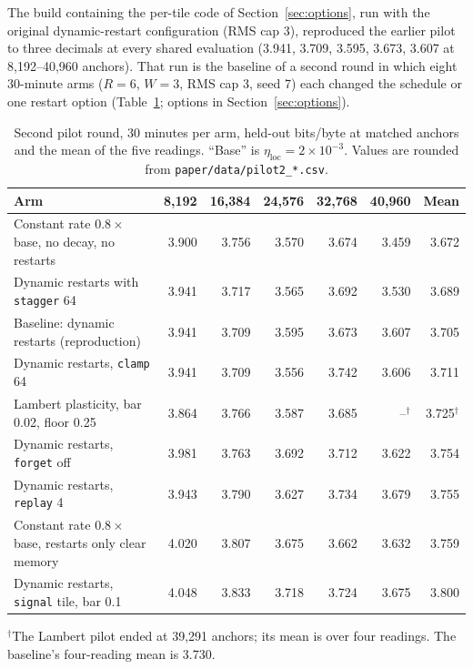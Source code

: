 \documentclass[10pt]{article}
\newcommand{\bpb}{bits/byte}
\newcommand{\code}[1]{\texttt{#1}}
\begin{document}
The build containing the per-tile code of Section~\ref{sec:options}, run with the original
dynamic-restart configuration (RMS cap 3), reproduced the earlier pilot to three decimals at every
shared evaluation (3.941, 3.709, 3.595, 3.673, 3.607 at 8,192--40,960 anchors). That run is the
baseline of a second round in which eight 30-minute arms ($R=6$, $W=3$, RMS cap 3, seed 7) each changed
the schedule or one restart option (Table~\ref{tab:pilot2}; options in Section~\ref{sec:options}).

\begin{table}[t]
\centering
\caption{Second pilot round, 30 minutes per arm, held-out \bpb{} at matched anchors and the mean of
the five readings. ``Base'' is $\eta_{\text{loc}}=2\times10^{-3}$. Values are rounded from
\code{paper/data/pilot2\_*.csv}.}
\label{tab:pilot2}
\small
\begin{tabular}{lrrrrrr}
\toprule
Arm & 8,192 & 16,384 & 24,576 & 32,768 & 40,960 & Mean \\
\midrule
Constant rate $0.8\times$ base, no decay, no restarts & 3.900 & 3.756 & 3.570 & 3.674 & 3.459 & 3.672 \\
Dynamic restarts with \code{stagger} 64 & 3.941 & 3.717 & 3.565 & 3.692 & 3.530 & 3.689 \\
Baseline: dynamic restarts (reproduction) & 3.941 & 3.709 & 3.595 & 3.673 & 3.607 & 3.705 \\
Dynamic restarts, \code{clamp} 64 & 3.941 & 3.709 & 3.556 & 3.742 & 3.606 & 3.711 \\
Lambert plasticity, bar 0.02, floor 0.25 & 3.864 & 3.766 & 3.587 & 3.685 & --$^{\dagger}$ & 3.725$^{\dagger}$ \\
Dynamic restarts, \code{forget} off & 3.981 & 3.763 & 3.692 & 3.712 & 3.622 & 3.754 \\
Dynamic restarts, \code{replay} 4 & 3.943 & 3.790 & 3.627 & 3.734 & 3.679 & 3.755 \\
Constant rate $0.8\times$ base, restarts only clear memory & 4.020 & 3.807 & 3.675 & 3.662 & 3.632 & 3.759 \\
Dynamic restarts, \code{signal} tile, bar 0.1 & 4.048 & 3.833 & 3.718 & 3.724 & 3.675 & 3.800 \\
\bottomrule
\end{tabular}

\smallskip
{\footnotesize $^\dagger$The Lambert pilot ended at 39,291 anchors; its mean is over four readings.
The baseline's four-reading mean is 3.730.}
\end{table}
\end{document}
